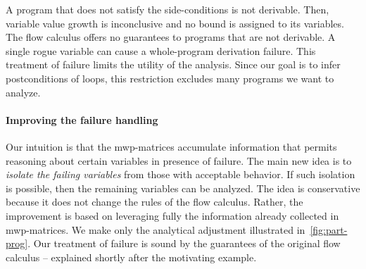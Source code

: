 A program that does not satisfy the side-conditions is not derivable.
Then, variable value growth is inconclusive and no bound is assigned to its variables.
The flow calculus offers no guarantees to programs that are not derivable.
A single rogue variable can cause a whole-program derivation failure.
This treatment of failure limits the utility of the analysis.
Since our goal is to infer postconditions of loops, this restriction excludes many programs we want to analyze.

\paragraph*{Improving the failure handling}
Our intuition is that the mwp-matrices accumulate information that permits reasoning about {certain variables} in presence of failure.
The main new idea is to \emph{isolate the failing variables} from those with acceptable behavior.
If such isolation is possible, then the remaining variables can be analyzed.
The idea is conservative because it does not change the rules of the flow calculus.
Rather, the improvement is based on leveraging fully the information already collected in mwp-matrices.
We make only the analytical adjustment illustrated in~\autoref{fig:part-prog}.
Our treatment of failure is sound by the guarantees of the original flow calculus -- explained shortly after the motivating example.

